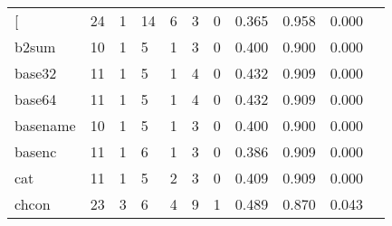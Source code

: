 \begin{longtable}{lp{1.10cm}p{1.10cm}p{1.10cm}p{1.10cm}p{1.10cm}p{1.10cm}p{1.10cm}p{1.10cm}p{1.10cm}p{1.10cm}}
\bottomrule
\endlastfoot
{[}         &                     24 &                                  1 &                                14 &                                6 &                                 3 &                               0 &                          0.365 &                                 0.958 &                               0.000 \\
b2sum     &                     10 &                                  1 &                                 5 &                                1 &                                 3 &                               0 &                          0.400 &                                 0.900 &                               0.000 \\
base32    &                     11 &                                  1 &                                 5 &                                1 &                                 4 &                               0 &                          0.432 &                                 0.909 &                               0.000 \\
base64    &                     11 &                                  1 &                                 5 &                                1 &                                 4 &                               0 &                          0.432 &                                 0.909 &                               0.000 \\
basename  &                     10 &                                  1 &                                 5 &                                1 &                                 3 &                               0 &                          0.400 &                                 0.900 &                               0.000 \\
basenc    &                     11 &                                  1 &                                 6 &                                1 &                                 3 &                               0 &                          0.386 &                                 0.909 &                               0.000 \\
cat       &                     11 &                                  1 &                                 5 &                                2 &                                 3 &                               0 &                          0.409 &                                 0.909 &                               0.000 \\
chcon     &                     23 &                                  3 &                                 6 &                                4 &                                 9 &                               1 &                          0.489 &                                 0.870 &                               0.043 \\

\end{longtable}
